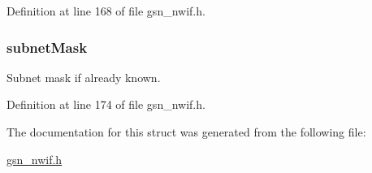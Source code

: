 Definition at line 168 of file gsn\_\-nwif.h.

\hypertarget{a00170_a57e84f1cb54cb270925550e459768abe}{
\subsubsection[{subnetMask}]{ {\bf subnetMask}}}
\label{a00170_a57e84f1cb54cb270925550e459768abe}
Subnet mask if already known. 

Definition at line 174 of file gsn\_\-nwif.h.



The documentation for this struct was generated from the following file:\begin{DoxyCompactItemize}
\item 
\hyperlink{a00534}{gsn\_\-nwif.h}\end{DoxyCompactItemize}
